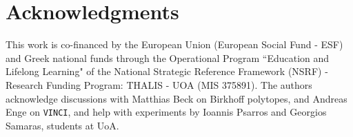 \documentclass[11pt,a4paper]{article}
\begin{document}
\section{Acknowledgments}
This work is  
co-financed by the European Union (European Social Fund - ESF) and Greek national funds through the Operational Program ``Education and Lifelong Learning" of the National Strategic Reference Framework (NSRF) - Research Funding Program: THALIS - UOA (MIS 375891).
The authors acknowledge discussions with Matthias Beck on Birkhoff polytopes,
and Andreas Enge on {\tt VINCI}, and help with experiments
by Ioannis Psarros and Georgios Samaras, students at UoA.

  
\end{document}
